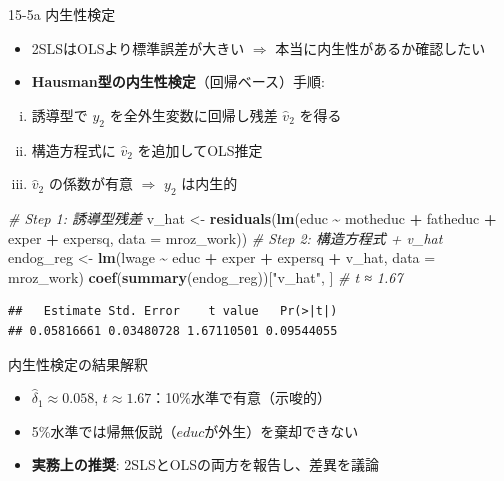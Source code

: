 \documentclass[
  ignorenonframetext,
]{beamer}
\newenvironment{Shaded}{\begin{snugshade}}{\end{snugshade}}
\newcommand{\AttributeTok}[1]{\textcolor[rgb]{0.13,0.29,0.53}{#1}}
\newcommand{\CommentTok}[1]{\textcolor[rgb]{0.56,0.35,0.01}{\textit{#1}}}
\newcommand{\FunctionTok}[1]{\textcolor[rgb]{0.13,0.29,0.53}{\textbf{#1}}}
\newcommand{\NormalTok}[1]{#1}
\newcommand{\OtherTok}[1]{\textcolor[rgb]{0.56,0.35,0.01}{#1}}
\newcommand{\SpecialCharTok}[1]{\textcolor[rgb]{0.81,0.36,0.00}{\textbf{#1}}}
\newcommand{\StringTok}[1]{\textcolor[rgb]{0.31,0.60,0.02}{#1}}
\providecommand{\tightlist}{%
  \setlength{\itemsep}{0pt}\setlength{\parskip}{0pt}}
\begin{document}
\begin{frame}[fragile]{15-5a 内生性検定}
\label{a-ux5185ux751fux6027ux691cux5b9a}
\begin{itemize}
\tightlist
\item
  2SLSはOLSより標準誤差が大きい \(\Rightarrow\)
  本当に内生性があるか確認したい
\item
  \textbf{Hausman型の内生性検定}（回帰ベース）手順:
\end{itemize}

\begin{enumerate}
[(i)]
\item
  誘導型で \(y_2\) を全外生変数に回帰し残差 \(\hat{v}_2\) を得る
\item
  構造方程式に \(\hat{v}_2\) を追加してOLS推定
\item
  \(\hat{v}_2\) の係数が有意 \(\Rightarrow\) \(y_2\) は内生的
\end{enumerate}

\scriptsize

\begin{Shaded}
\begin{Highlighting}[]
\CommentTok{\# Step 1: 誘導型残差}
\NormalTok{v\_hat }\OtherTok{\textless{}{-}} \FunctionTok{residuals}\NormalTok{(}\FunctionTok{lm}\NormalTok{(educ }\SpecialCharTok{\textasciitilde{}}\NormalTok{ motheduc }\SpecialCharTok{+}\NormalTok{ fatheduc }\SpecialCharTok{+}\NormalTok{ exper }\SpecialCharTok{+}\NormalTok{ expersq,}
                      \AttributeTok{data =}\NormalTok{ mroz\_work))}
\CommentTok{\# Step 2: 構造方程式 + v\_hat}
\NormalTok{endog\_reg }\OtherTok{\textless{}{-}} \FunctionTok{lm}\NormalTok{(lwage }\SpecialCharTok{\textasciitilde{}}\NormalTok{ educ }\SpecialCharTok{+}\NormalTok{ exper }\SpecialCharTok{+}\NormalTok{ expersq }\SpecialCharTok{+}\NormalTok{ v\_hat, }\AttributeTok{data =}\NormalTok{ mroz\_work)}
\FunctionTok{coef}\NormalTok{(}\FunctionTok{summary}\NormalTok{(endog\_reg))[}\StringTok{"v\_hat"}\NormalTok{, ]  }\CommentTok{\# t ≈ 1.67}
\end{Highlighting}
\end{Shaded}

\begin{verbatim}
##   Estimate Std. Error    t value   Pr(>|t|) 
## 0.05816661 0.03480728 1.67110501 0.09544055
\end{verbatim}

\normalsize
\end{frame}

\begin{frame}{内生性検定の結果解釈}
\label{ux5185ux751fux6027ux691cux5b9aux306eux7d50ux679cux89e3ux91c8}
\begin{itemize}
\tightlist
\item
  \(\hat{\delta}_1 \approx 0.058\),
  \(t \approx 1.67\)：10\%水準で有意（示唆的）
\item
  5\%水準では帰無仮説（\(educ\)が外生）を棄却できない
\item
  \textbf{実務上の推奨}: 2SLSとOLSの両方を報告し、差異を議論
\end{itemize}
\end{frame}
\end{document}

